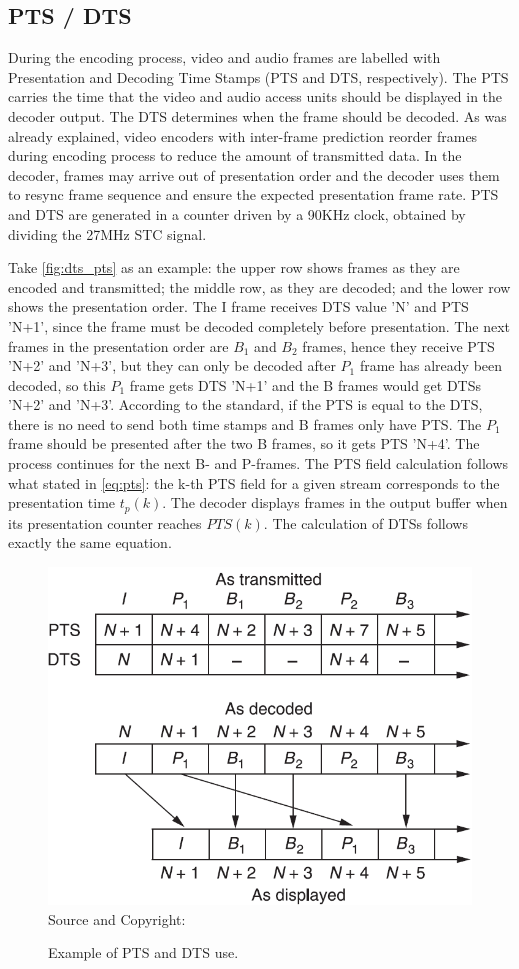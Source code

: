 \documentclass[
	12pt,				%
	openright,			%
	twoside,			%
	a4paper,			%
	brazil,
	french,				%
	english
	]{abntex2}
\begin{document}
\subsection{PTS / DTS}
\label{PTS_DTS}

During the encoding process, video and audio frames are labelled with Presentation and Decoding Time Stamps (PTS and DTS, respectively). The PTS carries the time that the video and audio access units should be displayed in the decoder output. The DTS determines when the frame should be decoded. As was already explained, video encoders with inter-frame prediction reorder frames during encoding process to reduce the amount of transmitted data. In the decoder, frames may arrive out of presentation order and the decoder uses them to resync frame sequence and ensure the expected presentation frame rate. PTS and DTS are generated in a counter driven by a 90KHz clock, obtained by dividing the 27MHz STC signal.

Take \autoref{fig:dts_pts} as an example: the upper row shows frames as they are encoded and transmitted; the middle row, as they are decoded; and the lower row shows the presentation order. The I frame receives DTS value 'N' and PTS 'N+1', since the frame must be decoded completely before presentation. The next frames in the presentation order are $B_1$ and $B_2$ frames, hence they receive PTS 'N+2' and 'N+3', but they can only be decoded after $P_1$ frame has already been decoded, so this $P_1$ frame gets DTS 'N+1' and the B frames would get DTSs 'N+2' and 'N+3'. According to the standard, if the PTS is equal to the DTS, there is no need to send both time stamps and B frames only have PTS. The $P_1$ frame should be presented after the two B frames, so it gets PTS 'N+4'. The process continues for the next B- and P-frames. The PTS field calculation follows what stated in \autoref{eq:pts}: the k-th PTS field for a given stream corresponds to the presentation time $t_p(k)$. The decoder displays frames in the output buffer when its presentation counter reaches $PTS(k)$. The calculation of DTSs follows exactly the same equation.

\begin{figure}[!hb]
\centering
\caption{Example of PTS and DTS use.}
\includegraphics[width=0.5\linewidth]{figuras/dts_pts_2.png}
\\Source and Copyright: \cite{watkinson}
\label{fig:dts_pts}
\end{figure}
\end{document}
